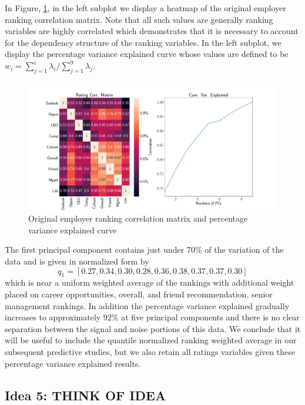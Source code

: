 \documentclass[10pt]{article}
\begin{document}
In Figure, \ref{fig:pcagr}, in the left subplot we display a heatmap of the 
original employer ranking correlation matrix.  Note that all such values 
are generally ranking variables are highly correlated which demonstrates 
that it is necessary to account for the dependency structure of the ranking 
variables.  In the left subplot, we display the percentage variance explained curve 
whose values are defined to be $w_i = \sum_{j=1}^i\lambda_i/\sum_{j=1}^9\lambda_j$. 
%
\begin{figure}[thb]
    \centering
	\includegraphics[width=1.0\linewidth]{pcagr.pdf}
	\caption{Original employer ranking correlation matrix and percentage variance 
    explained curve}
	\label{fig:pcagr}
\end{figure}
%
The first principal component contains just under 70\% of the variation of the data 
and is given in normalized form by  
%
\begin{equation}
    q_1 = [0.27,0.34,0.30,0.28,0.36,0.38,0.37,0.37,0.30] 
\end{equation}
%
which is near a uniform weighted average of the rankings with additional 
weight placed on career opportunities, overall, and friend recommendation, 
senior management rankings. In addition the percentage variance explained 
gradually increases to approximately 92\% at five principal components and 
there is no clear separation between the signal and noise portions of this data.
We conclude that it will be useful to include the quantile normalized 
ranking weighted average in our subsequent predictive studies, but we 
also retain all ratings variables given these percentage variance explained results. 

\subsection{Idea 5: THINK OF IDEA}
\end{document}
